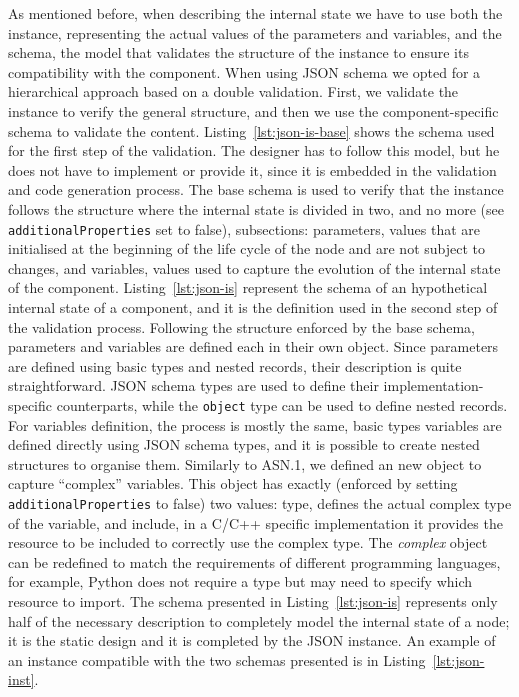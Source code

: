 As mentioned before, when describing the internal state we have to use both the instance, representing the actual values of the parameters and variables, and the schema, the model that validates the structure of the instance to ensure its compatibility with the component. When using JSON schema we opted for a hierarchical approach based on a double validation. First, we validate the instance to verify the general structure, and then we use the component-specific schema to validate the content. Listing~\ref{lst:json-is-base} shows the schema used for the first step of the validation. The designer has to follow this model, but he does not have to implement or provide it, since it is embedded in the validation and code generation process. The base schema is used to verify that the instance follows the structure where the internal state is divided in two, and no more (see \texttt{additionalProperties} set to false), subsections: parameters, values that are initialised at the beginning of the life cycle of the node and are not subject to changes, and variables, values used to capture the evolution of the internal state of the component. Listing~\ref{lst:json-is} represent the schema of an hypothetical internal state of a component, and it is the definition used in the second step of the validation process. Following the structure enforced by the base schema, parameters and variables are defined each in their own object. Since parameters are defined using basic types and nested records, their description is quite straightforward. JSON schema types are used to define their implementation-specific counterparts, while the \texttt{object} type can be used to define nested records. For variables definition, the process is mostly the same, basic types variables are defined directly using JSON schema types, and it is possible to create nested structures to organise them. Similarly to ASN.1, we defined an new object to capture ``complex'' variables. This object has exactly (enforced by setting \texttt{additionalProperties} to false) two values: type, defines the actual complex type of the variable, and include, in a C/C++ specific implementation it provides the resource to be included to correctly use the complex type. The \textit{complex} object can be redefined to match the requirements of different programming languages, for example, Python does not require a type but may need to specify which resource to import. The schema presented in Listing~\ref{lst:json-is} represents only half of the necessary description to completely model the internal state of a node; it is the static design and it is completed by the JSON instance. An example of an instance compatible with the two schemas presented is in Listing~\ref{lst:json-inst}.

